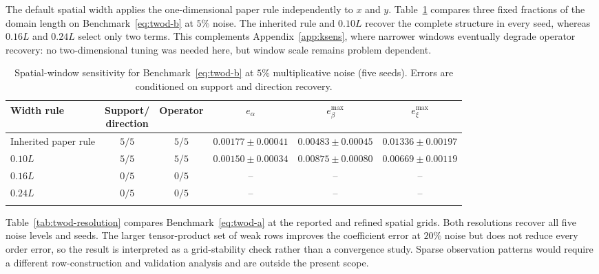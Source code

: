The default spatial width applies the one-dimensional paper rule independently to $x$ and $y$. Table~\ref{tab:twod-width} compares three fixed fractions of the domain length on Benchmark~\eqref{eq:twod-b} at $5\%$ noise. The inherited rule and $0.10L$ recover the complete structure in every seed, whereas $0.16L$ and $0.24L$ select only two terms. This complements Appendix~\ref{app:ksens}, where narrower windows eventually degrade operator recovery: no two-dimensional tuning was needed here, but window scale remains problem dependent.

\begin{table}[t]
\centering
\caption{Spatial-window sensitivity for Benchmark~\eqref{eq:twod-b} at $5\%$ multiplicative noise (five seeds). Errors are conditioned on support and direction recovery.}\label{tab:twod-width}
\footnotesize
\setlength{\tabcolsep}{1.2pt}
\begin{tabular*}{\textwidth}{@{\extracolsep\fill}lccccc}
\toprule
Width rule & \shortstack{Support/\\direction} & Operator & $e_\alpha$ & $e_\beta^{\max}$ & $e_\xi^{\max}$ \\
\midrule
Inherited paper rule & $5/5$ & $5/5$ & $0.00177\pm0.00041$ & $0.00483\pm0.00045$ & $0.01336\pm0.00197$ \\
$0.10L$ & $5/5$ & $5/5$ & $0.00150\pm0.00034$ & $0.00875\pm0.00080$ & $0.00669\pm0.00119$ \\
$0.16L$ & $0/5$ & $0/5$ & -- & -- & -- \\
$0.24L$ & $0/5$ & $0/5$ & -- & -- & -- \\
\botrule
\end{tabular*}
\end{table}

Table~\ref{tab:twod-resolution} compares Benchmark~\eqref{eq:twod-a} at the reported and refined spatial grids. Both resolutions recover all five noise levels and seeds. The larger tensor-product set of weak rows improves the coefficient error at $20\%$ noise but does not reduce every order error, so the result is interpreted as a grid-stability check rather than a convergence study. Sparse observation patterns would require a different row-construction and validation analysis and are outside the present scope.

